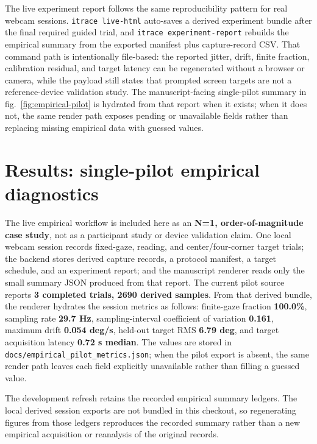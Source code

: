 \documentclass[
]{article}
\begin{document}
The live experiment report follows the same reproducibility pattern for
real webcam sessions. \texttt{itrace\ live-html} auto-saves a derived
experiment bundle after the final required guided trial, and
\texttt{itrace\ experiment-report} rebuilds the empirical summary from
the exported manifest plus capture-record CSV. That command path is
intentionally file-based: the reported jitter, drift, finite fraction,
calibration residual, and target latency can be regenerated without a
browser or camera, while the payload still states that prompted screen
targets are not a reference-device validation study. The
manuscript-facing single-pilot summary in fig.~\ref{fig:empirical-pilot}
is hydrated from that report when it exists; when it does not, the same
render path exposes pending or unavailable fields rather than replacing
missing empirical data with guessed values.

\section{Results: single-pilot empirical
diagnostics}\label{sec:empirical-pilot}

The live empirical workflow is included here as an \textbf{N=1,
order-of-magnitude case study}, not as a participant study or device
validation claim. One local webcam session records fixed-gaze, reading,
and center/four-corner target trials; the backend stores derived capture
records, a protocol manifest, a target schedule, and an experiment
report; and the manuscript renderer reads only the small summary JSON
produced from that report. The current pilot source reports \textbf{3
completed trials, 2690 derived samples}. From that derived bundle, the
renderer hydrates the session metrics as follows: finite-gaze fraction
\textbf{100.0\%}, sampling rate \textbf{29.7 Hz}, sampling-interval
coefficient of variation \textbf{0.161}, maximum drift \textbf{0.054
deg/s}, held-out target RMS \textbf{6.79 deg}, and target acquisition
latency \textbf{0.72 s median}. The values are stored in
\texttt{docs/empirical\_pilot\_metrics.json}; when the pilot export is
absent, the same render path leaves each field explicitly unavailable
rather than filling a guessed value.

The development refresh retains the recorded empirical summary ledgers.
The local derived session exports are not bundled in this checkout, so
regenerating figures from those ledgers reproduces the recorded summary
rather than a new empirical acquisition or reanalysis of the original
records.
\end{document}
